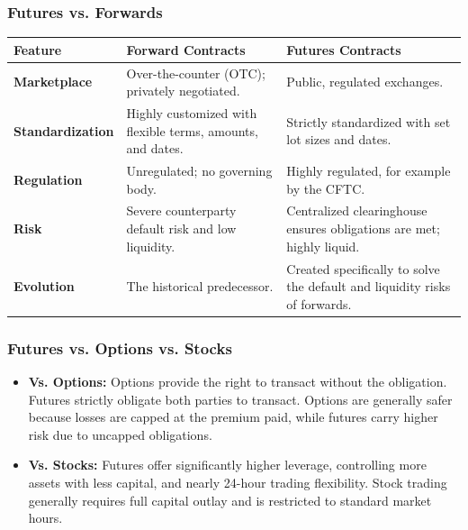\documentclass[12pt,openany]{book}
\begin{document}
\subsubsection{Futures vs. Forwards}

\begin{center}
\small
\renewcommand{\arraystretch}{1.2}
\begin{tabular}{|L{0.22\textwidth}|L{0.32\textwidth}|L{0.32\textwidth}|}
\hline
\textbf{Feature} & \textbf{Forward Contracts} & \textbf{Futures Contracts} \\ \hline
\textbf{Marketplace} & Over-the-counter (OTC); privately negotiated. & Public, regulated exchanges. \\ \hline
\textbf{Standardization} & Highly customized with flexible terms, amounts, and dates. & Strictly standardized with set lot sizes and dates. \\ \hline
\textbf{Regulation} & Unregulated; no governing body. & Highly regulated, for example by the CFTC. \\ \hline
\textbf{Risk} & Severe counterparty default risk and low liquidity. & Centralized clearinghouse ensures obligations are met; highly liquid. \\ \hline
\textbf{Evolution} & The historical predecessor. & Created specifically to solve the default and liquidity risks of forwards. \\ \hline
\end{tabular}
\end{center}

\subsubsection{Futures vs. Options vs. Stocks}

\begin{itemize}[leftmargin=*]
    \item \textbf{Vs. Options:} Options provide the right to transact without the obligation. Futures strictly obligate both parties to transact. Options are generally safer because losses are capped at the premium paid, while futures carry higher risk due to uncapped obligations.
    \item \textbf{Vs. Stocks:} Futures offer significantly higher leverage, controlling more assets with less capital, and nearly 24-hour trading flexibility. Stock trading generally requires full capital outlay and is restricted to standard market hours.
\end{itemize}
\end{document}
